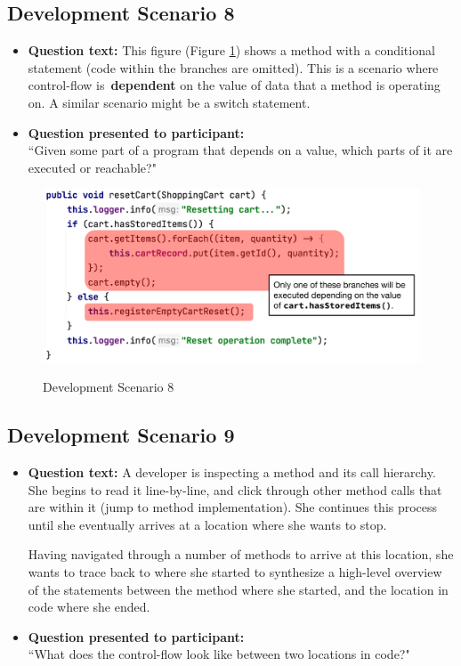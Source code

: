 \subsection{Development Scenario 8}

\begin{itemize}
  \item[] \textbf{Question text:} This figure (Figure \ref{fig:DS8}) shows a 
          method with a conditional statement (code within the branches are 
          omitted). This is a scenario where control-flow is \textbf{dependent} 
          on the value of data that a method is operating on. 
          A similar scenario might be a switch statement.
\item[] \textbf{Question presented to participant:}  \\
         ``Given some part of a program that depends on a value, which parts of 
         it are executed or reachable?"
\end{itemize}

\begin{figure}[ht!]
\centering
\caption{Development Scenario 8}
\includegraphics[width=\textwidth]{./figs/ds8.png}
\label{fig:DS8}
\end{figure}

\pagebreak

\subsection{Development Scenario 9}

\begin{itemize}
  \item[] \textbf{Question text:} A developer is inspecting a method and its 
          call hierarchy. She begins to read it line-by-line, and click through 
          other method calls that are within it (\eg jump to method 
          implementation). She continues this process until she eventually 
          arrives at a location where she wants to stop.

         \par Having navigated through a number of methods to arrive at this 
         location, she wants to trace back to where she started to synthesize a 
         high-level overview of the statements between the method where she 
         started, and the location in code where she ended.
  \item[] \textbf{Question presented to participant:}  \\
         ``What does the control-flow look like between two locations in code?"
\end{itemize}
